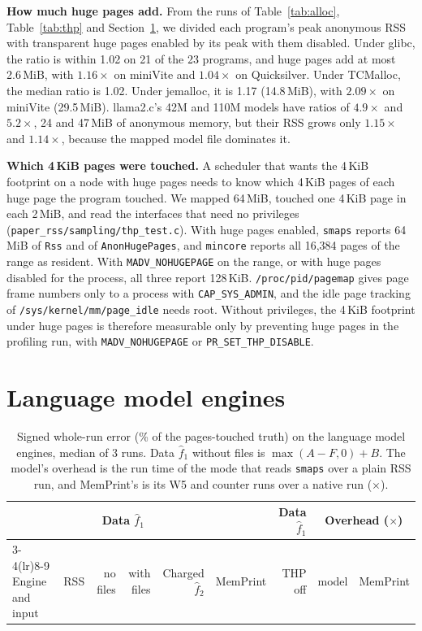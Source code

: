 \documentclass[11pt]{article}
\newcommand{\memprint}{MemPrint}
\newcommand{\secref}[1]{Section~\ref{#1}}
\newcommand{\tabref}[1]{Table~\ref{#1}}
\begin{document}
\textbf{How much huge pages add.} From the runs of \tabref{tab:alloc}, \tabref{tab:thp} and \secref{sec:llm}, we
divided each program's peak anonymous RSS with transparent huge pages enabled by its peak with them disabled. Under
glibc, the ratio is within 1.02 on 21 of the 23 programs, and huge pages add at most 2.6\,MiB, with $1.16\times$ on
miniVite and $1.04\times$ on Quicksilver. Under TCMalloc, the median ratio is 1.02. Under jemalloc, it is 1.17 (14.8\,MiB),
with $2.09\times$ on miniVite (29.5\,MiB). llama2.c's 42M and 110M models have ratios of $4.9\times$ and $5.2\times$,
24 and 47\,MiB of anonymous memory, but their RSS grows only $1.15\times$ and $1.14\times$, because the mapped model
file dominates it.

\textbf{Which 4\,KiB pages were touched.} A scheduler that wants the 4\,KiB footprint on a node with huge pages needs
to know which 4\,KiB pages of each huge page the program touched. We mapped 64\,MiB, touched one 4\,KiB page in each
2\,MiB, and read the interfaces that need no privileges (\texttt{paper\_rss/sampling/thp\_test.c}). With huge pages
enabled, \texttt{smaps} reports 64\,MiB of \texttt{Rss} and of \texttt{AnonHugePages}, and \texttt{mincore} reports
all 16{,}384 pages of the range as resident. With \texttt{MADV\_NOHUGEPAGE} on the range, or with huge pages disabled
for the process, all three report 128\,KiB. \texttt{/proc/pid/pagemap} gives page frame numbers only to a process with
\texttt{CAP\_SYS\_ADMIN}, and the idle page tracking of \texttt{/sys/kernel/mm/page\_idle} needs root. Without
privileges, the 4\,KiB footprint under huge pages is therefore measurable only by preventing huge pages in the
profiling run, with \texttt{MADV\_NOHUGEPAGE} or \texttt{PR\_SET\_THP\_DISABLE}.

\section{Language model engines}
\label{sec:llm}

\begin{table}[t]
\centering
\small
\caption{Signed whole-run error (\% of the pages-touched truth) on the language model engines, median of 3 runs. Data
$\hat f_1$ without files is $\max(A - F, 0) + B$. The model's overhead is the run time of the mode that reads \texttt{smaps}
over a plain RSS run, and \memprint{}'s is its W5 and counter runs over a native run ($\times$).}
\label{tab:llm}
\setlength{\tabcolsep}{4.5pt}
\begin{tabular}{lrrrrrrrr}
\toprule
 & & \multicolumn{2}{c}{Data $\hat f_1$} & & & Data $\hat f_1$ & \multicolumn{2}{c}{Overhead ($\times$)} \\
\cmidrule(lr){3-4}\cmidrule(lr){8-9}
Engine and input & RSS & no files & with files & Charged $\hat f_2$ & \memprint{} & THP off & model & \memprint{} \\
\midrule

\bottomrule
\end{tabular}
\end{table}
\end{document}
